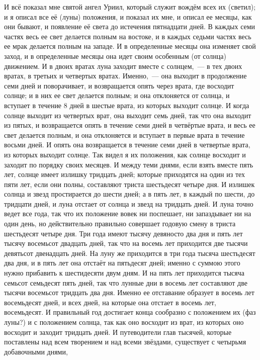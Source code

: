 И всё показал мне святой ангел Уриил, который служит вождём всех их
(светил); и я описал все её (луны) положения, и показал их мне, и описал ее
месяцы, как они бывают, и появление её света до истечения пятнадцати дней.
В каждых семи частях весь ее свет делается полным на востоке, и в
каждых седьми частях весь ее мрак делается полным на западе.
И в определенные месяцы она изменяет свой заход, и в определенные
месяцы она идет своим особенным (от солнца) движением.
И в двоих вратах луна заходит вместе с солнцем,~--- в тех двоих вратах,
в третьих и четвертых вратах.
Именно,~--- она выходит в продолжение семи дней и поворачивает, и
возвращается опять через врата, где восходит солнце; и в них ее свет делается
полным; и она отклоняется от солнца, и вступает в течение 8 дней в шестые
врата, из которых выходит солнце.
И когда солнце выходит из четвертых врат, она выходит семь дней, так
что она выходит из пятых, и возвращается опять в течение семи дней в четвёртые
врата, и весь ее свет делается полным, и она отклоняется и вступает в первые
врата в течение восьми дней.
И опять она возвращается в течение семи дней в четвертые врата, из
которых выходит солнце.
Так видел я их положения, как солнце восходит и заходит по порядку
своих месяцев.
И между теми днями, если взять вместе пять лет, солнце имеет излишку
тридцать дней; которые приходятся на один из тех пяти лет, если они полны,
составляют триста шестьдесят четыре дня.
И излишек солнца и звезд простирается до шести дней; а в пять лет, в
каждый по шести, до тридцати дней, и луна отстает от солнца и звезд на тридцать
дней.
И луна точно ведет все года, так что их положение вовек ни поспешает,
ни запаздывает ни на один день, но действительно правильно совершает годовую
смену в триста шестьдесят четыре дня.
Три года имеют тысячу девяносто два дня и пять лет тысячу восемьсот
двадцать дней, так что на восемь лет приходится две тысячи девятьсот двенадцать
дней.
На луну же приходится в три года тысяча шестьдесят два дня, и в пять
лет она отстаёт на пятьдесят дней; именно с суммою этого нужно прибавить к
шестидесяти двум дням.
И на пять лет приходится тысяча семьсот семьдесят пять дней, так что
лунные дни в восемь лет составляют две тысячи восемьсот тридцать два дня.
Именно ее отставание образует в восемь лет восемьдесят дней, и всех
дней, на которые она отстает в восемь лет, восемьдесят.
И правильный год достигает конца сообразно с положением их (фаз луны?)
и с положением солнца, так как оно восходит из врат, из которых оно восходит и
заходит тридцать дней.
И путеводители глав тысячей, которые поставлены над всем
творением и над всеми звёздами, существует с четырьмя добавочными днями,
